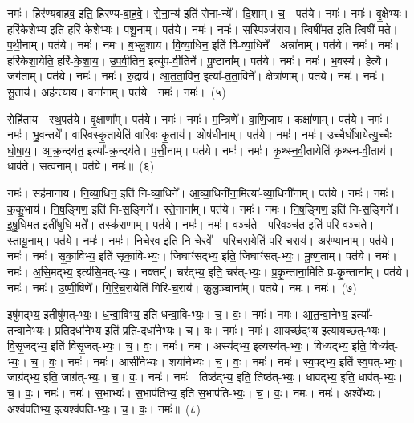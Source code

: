 नमः॑। हिर॑ण्यबाहव॒ इति॒ हिर॑ण्य-बा॒ह॒वे॒। से॒ना॒न्य॑ इति॑ सेना-न्ये᳚। दि॒शाम्। च॒। पत॑ये। नमः॑। 
नमः॑। वृ॒क्षेभ्यः॑। हरि॑केशेभ्य॒ इति॒ हरि॑-के॒शे॒भ्यः॒। प॒शू॒नाम्। पत॑ये। नमः॑। 
नमः॑। स॒स्पिञ्ज॑राय। त्विषी॑मत॒ इति॒ त्विषी॑-म॒ते॒। प॒थी॒नाम्। पत॑ये। नमः॑। 
नमः॑। ब॒भ्लु॒शाय॑। वि॒व्या॒धिन॒ इति॑ वि-व्या॒धिने᳚। अन्ना॑नाम्। पत॑ये। नमः॑। 
नमः॑। हरि॑केशा॒येति॒ हरि॑-के॒शा॒य॒। उ॒प॒वी॒तिन॒ इत्यु॑प-वी॒तिने᳚। पु॒ष्टाना᳚म्। पत॑ये। नमः॑। 
नमः॑। भ॒वस्य॑। हे॒त्यै। जग॑ताम्। पत॑ये। नमः॑। 
नमः॑। रु॒द्राय॑। आ॒त॒ता॒विन॒ इत्या᳚-त॒ता॒विने᳚। क्षेत्रा॑णाम्। पत॑ये। नमः॑। 
नमः॑। सू॒ताय॑। अह॑न्त्याय। वना॑नाम्। पत॑ये। नमः॑। 
नमः॑।~(५)


रोहि॑ताय। स्थ॒पत॑ये। वृ॒क्षाणा᳚म्। पत॑ये। नमः॑। 
नमः॑। म॒न्त्रिणे᳚। वा॒णि॒जाय॑। कक्षा॑णाम्। पत॑ये। नमः॑। 
नमः॑। भु॒व॒न्तये᳚। वा॒रि॒व॒स्कृ॒तायेति॑ वारिवः-कृ॒ताय॑। ओष॑धीनाम्। पत॑ये। नमः॑। 
नमः॑। उ॒च्चैर्घो॑षा॒येत्यु॒च्चैः-घो॒षा॒य॒। आ॒क्र॒न्दय॑त॒ इत्या᳚-क्र॒न्दय॑ते। प॒त्ती॒नाम्। पत॑ये। नमः॑। 
नमः॑। कृ॒थ्स्न॒वी॒तायेति॑ कृथ्स्न-वी॒ताय॑। धाव॑ते। सत्व॑नाम्। पत॑ये। नमः॑॥~(६)


नमः॑। सह॑मानाय। नि॒व्या॒धिन॒ इति॑ नि-व्या॒धिने᳚। आ॒व्या॒धिनी॑ना॒\-मित्या᳚-व्या॒धिनी॑नाम्। पत॑ये। नमः॑। 
नमः॑। क॒कु॒भाय॑। नि॒ष॒ङ्गिण॒ इति॑ नि-स॒ङ्गिने᳚। स्ते॒नाना᳚म्। पत॑ये। नमः॑। 
नमः॑। नि॒ष॒ङ्गिण॒ इति॑ नि-स॒ङ्गिने᳚। इ॒षु॒धि॒मत॒ इती॑षुधि-मते᳚। तस्क॑राणाम्। पत॑ये। नमः॑। 
नमः॑। वञ्च॑ते। प॒रि॒वञ्च॑त॒ इति॑ परि-वञ्च॑ते। स्ता॒यू॒नाम्। पत॑ये। नमः॑। 
नमः॑। नि॒चे॒रव॒ इति॑ नि-चे॒रवे᳚। प॒रि॒च॒रायेति॑ परि-च॒राय॑। अर॑ण्यानाम्। पत॑ये। नमः॑। 
नमः॑। सृ॒का॒विभ्य॒ इति॑ सृका॒वि-भ्यः॒। जिघाꣳ॑सद्भ्य॒ इति॒ जिघाꣳ॑सत्-भ्यः॒। मु॒ष्ण॒ताम्। पत॑ये। नमः॑। 
नमः॑। अ॒सि॒मद्भ्य॒ इत्य॑सि॒मत्-भ्यः॒। नक्तम्᳚। चर॑द्भ्य॒ इति॒ चर॑त्-भ्यः॒। प्र॒कृ॒न्ताना॒मिति॑ प्र-कृ॒न्ताना᳚म्। पत॑ये। नमः॑। 
नमः॑। उ॒ष्णी॒षिणे᳚। गि॒रि॒च॒रायेति॑ गिरि-च॒राय॑। कु॒लु॒ञ्चाना᳚म्। पत॑ये। नमः॑। नमः॑।~(७)


इषु॑मद्भ्य॒ इतीषु॑मत्-भ्यः॒। ध॒न्वा॒विभ्य॒ इति॑ धन्वा॒वि-भ्यः॒। च॒। वः॒। नमः॑। 
नमः॑। आ॒त॒न्वा॒नेभ्य॒ इत्या᳚-त॒न्वा॒नेभ्यः॑। प्र॒ति॒दधा॑नेभ्य॒ इति॑ प्रति-दधा॑नेभ्यः। च॒। वः॒। नमः॑। 
नमः॑। आ॒यच्छ॑द्भ्य॒ इत्या॒यच्छ॑त्-भ्यः॒। वि॒सृ॒जद्भ्य॒ इति॑ विसृ॒जत्-भ्यः॒। च॒। वः॒। नमः॑। 
नमः॑। अस्य॑द्भ्य॒ इत्यस्य॑त्-भ्यः॒। विध्य॑द्भ्य॒ इति॒ विध्य॑त्-भ्यः॒। च॒। वः॒। नमः॑। 
नमः॑। आसी॑नेभ्यः। शया॑नेभ्यः। च॒। वः॒। नमः॑। 
नमः॑। स्व॒पद्भ्य॒ इति॑ स्व॒पत्-भ्यः॒। जाग्र॑द्भ्य॒ इति॒ जाग्र॑त्-भ्यः॒। च॒। वः॒। नमः॑। 
नमः॑। तिष्ठ॑द्भ्य॒ इति॒ तिष्ठ॑त्-भ्यः॒। धाव॑द्भ्य॒ इति॒ धाव॑त्-भ्यः॒। च॒। वः॒। नमः॑। 
नमः॑। स॒भाभ्यः॑। स॒भाप॑तिभ्य॒ इति॑ स॒भाप॑ति-भ्यः॒। च॒। वः॒। नमः॑। 
नमः॑। अश्वे᳚भ्यः। अश्व॑पतिभ्य॒ इत्यश्व॑पति-भ्यः॒। च॒। वः॒। नमः॑॥~(८)


